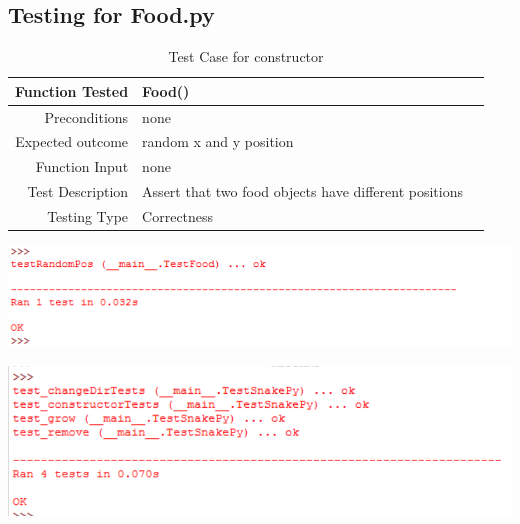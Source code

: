 \documentclass[12pt]{article}
\begin{document}
\subsection{Testing for Food.py}
\begin{center}
	\begin{longtable}{ | r | p{4cm} | p{4cm} }
	\caption{Test Case for constructor} \\ \hline \label{TblInputVar} 
	Function Tested & Food()\\ \hline
	Preconditions & none \\ \hline
	Expected outcome & random x and y position \\ \hline
	Function Input & none \\ \hline
	Test Description & Assert that two food objects have different positions \\ \hline
	Testing Type & Correctness\\ \hline
	
	\end{longtable}
\includegraphics{testFoodResults}\newline\newline	
\end{center}

\includegraphics{testSnakeResults}\newline\newline
\end{document}

